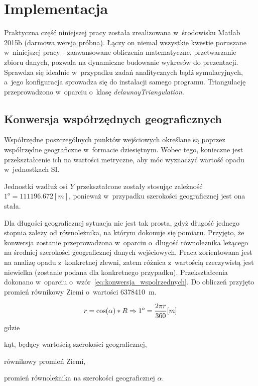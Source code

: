 \chapter{Implementacja}
\label{cha:implementacja}

Praktyczna część niniejszej pracy została zrealizowana w~środowisku Matlab 2015b (darmowa wersja próbna). Łączy on niemal wszystkie kwestie poruszane w~niniejszej pracy - zaawansowane obliczenia matematyczne, przetwarzanie zbioru danych, pozwala na dynamiczne budowanie wykresów do prezentacji. Sprawdza się idealnie w~przypadku zadań analitycznych bądź symulacyjnych, a~jego konfiguracja sprowadza się do instalacji samego programu. Triangulację przeprowadzono w~oparciu o~klasę \textit{delaunayTriangulation}.

\section{Konwersja współrzędnych geograficznych}
Współrzędne poszczególnych punktów wejściowych określane są poprzez współrzędne geograficzne w~formacie dziesiętnym. Wobec tego, konieczne jest przekształcenie ich na wartości metryczne, aby móc wyznaczyć wartość opadu w~jednostkach SI.

Jednostki wzdłuż osi $Y$ przekształcone zostały stosując zależność $1^o=111196.672 [m]$, ponieważ w~przypadku szerokości geograficznej jest ona stała.

Dla długości geograficznej sytuacja nie jest tak prosta, gdyż długość jednego stopnia zależy od równoleżnika, na którym dokonuje się pomiaru. Przyjęto, że konwersja zostanie przeprowadzona w~oparciu o~długość równoleżnika leżącego na średniej szerokości geograficznej danych wejściowych. Praca zorientowana jest na analizę opadu z~konkretnej zlewni, zatem różnica z~wartością rzeczywistą jest niewielka (zostanie podana dla konkretnego przypadku). Przekształcenia dokonano w~oparciu o~wzór~\ref{eq:konwersja_wspolrzednych}. Do obliczeń przyjęto promień równikowy Ziemi o~wartości 6378410~m.

\begin{equation}
	r = \cos(\alpha)*R \Rightarrow 1^o = \frac{2 \pi r}{360} [m] \\
	\label{eq:konwersja_wspolrzednych}
\end{equation}
gdzie
\begin{description}[leftmargin=2cm, itemsep=0cm, labelsep=0cm]
	\item[$\alpha$] kąt, będący wartością szerokości geograficznej,
	\item[$R$] równikowy promień Ziemi,
	\item[$r$] promień równoleżnika na szerokości geograficznej $\alpha$.
\end{description}


